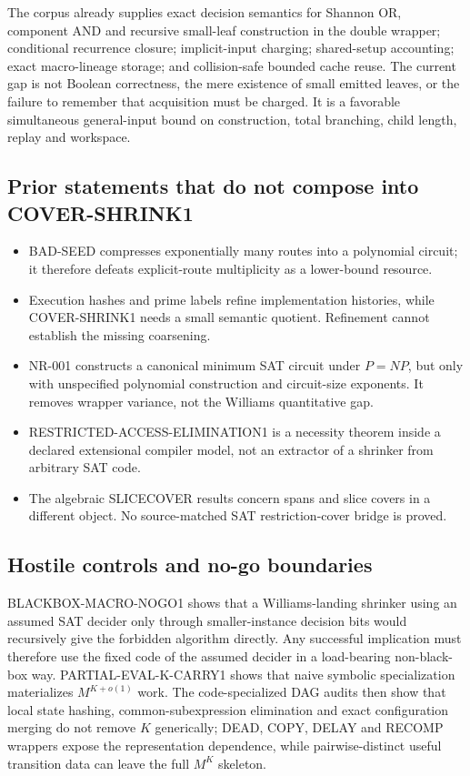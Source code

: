 \documentclass[11pt]{article}
\begin{document}
The corpus already supplies exact decision semantics for Shannon OR,
component AND and recursive small-leaf construction in the double wrapper;
conditional recurrence closure; implicit-input charging; shared-setup
accounting; exact macro-lineage storage; and collision-safe bounded cache
reuse.  The current gap is not Boolean correctness, the mere existence of
small emitted leaves, or the failure to remember that acquisition must be
charged.  It is a favorable simultaneous general-input bound on construction,
total branching, child length, replay and workspace.

\subsection{Prior statements that do not compose into COVER-SHRINK1}

\begin{itemize}
\item BAD-SEED compresses exponentially many routes into a polynomial circuit;
  it therefore defeats explicit-route multiplicity as a lower-bound resource.
\item Execution hashes and prime labels refine implementation histories, while
  COVER-SHRINK1 needs a small semantic quotient.  Refinement cannot establish
  the missing coarsening.
\item NR-001 constructs a canonical minimum SAT circuit under $P=NP$, but only
  with unspecified polynomial construction and circuit-size exponents.  It
  removes wrapper variance, not the Williams quantitative gap.
\item RESTRICTED-ACCESS-ELIMINATION1 is a necessity theorem inside a declared
  extensional compiler model, not an extractor of a shrinker from arbitrary
  SAT code.
\item The algebraic SLICECOVER results concern spans and slice covers in a
  different object.  No source-matched SAT restriction-cover bridge is proved.
\end{itemize}

\subsection{Hostile controls and no-go boundaries}

BLACKBOX-MACRO-NOGO1 shows that a Williams-landing shrinker using an assumed
SAT decider only through smaller-instance decision bits would recursively give
the forbidden algorithm directly.  Any successful implication must therefore
use the fixed code of the assumed decider in a load-bearing non-black-box way.
PARTIAL-EVAL-K-CARRY1 shows that naive symbolic specialization materializes
$M^{K+o(1)}$ work.  The code-specialized DAG audits then show that local state
hashing, common-subexpression elimination and exact configuration merging do
not remove $K$ generically; DEAD, COPY, DELAY and RECOMP wrappers expose the
representation dependence, while pairwise-distinct useful transition data
can leave the full $M^K$ skeleton.
\end{document}
